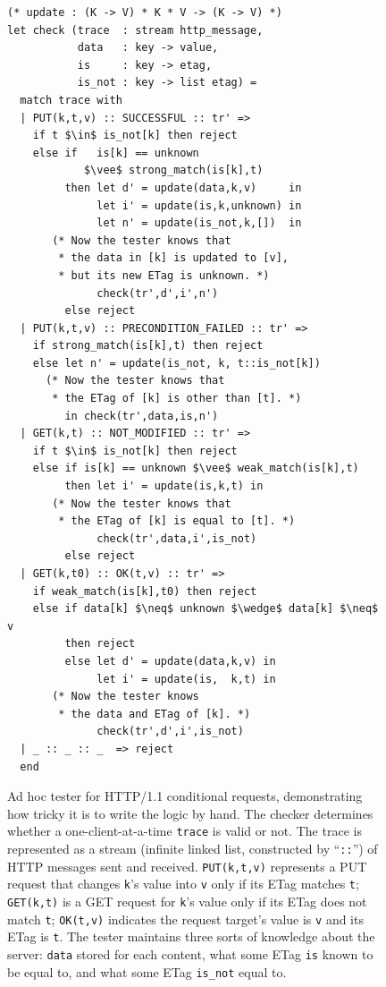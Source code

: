 \documentclass[12pt,oneside]{amsbook}
\newcommand{\http}{HTTP/1.1\xspace}
\newcommand{\ilc}[1]{\lstinline[style=customcoq]{#1}}
\numberwithin{section}{chapter}
\numberwithin{figure}{chapter}
\numberwithin{equation}{chapter}
\begin{document}
\begin{figure}
  \begin{lstlisting}[style=customcoq,mathescape=true]
(* update : (K -> V) * K * V -> (K -> V) *)
let check (trace  : stream http_message,
           data   : key -> value,
           is     : key -> etag,
           is_not : key -> list etag) =
  match trace with
  | PUT(k,t,v) :: SUCCESSFUL :: tr' =>
    if t $\in$ is_not[k] then reject
    else if   is[k] == unknown
            $\vee$ strong_match(is[k],t)
         then let d' = update(data,k,v)     in
              let i' = update(is,k,unknown) in
              let n' = update(is_not,k,[])  in
       (* Now the tester knows that
        * the data in [k] is updated to [v],
        * but its new ETag is unknown. *)
              check(tr',d',i',n')
         else reject
  | PUT(k,t,v) :: PRECONDITION_FAILED :: tr' =>
    if strong_match(is[k],t) then reject
    else let n' = update(is_not, k, t::is_not[k])
      (* Now the tester knows that
       * the ETag of [k] is other than [t]. *)
         in check(tr',data,is,n')
  | GET(k,t) :: NOT_MODIFIED :: tr' =>
    if t $\in$ is_not[k] then reject
    else if is[k] == unknown $\vee$ weak_match(is[k],t)
         then let i' = update(is,k,t) in
       (* Now the tester knows that
        * the ETag of [k] is equal to [t]. *)
              check(tr',data,i',is_not)
         else reject
  | GET(k,t0) :: OK(t,v) :: tr' =>
    if weak_match(is[k],t0) then reject
    else if data[k] $\neq$ unknown $\wedge$ data[k] $\neq$ v
         then reject
         else let d' = update(data,k,v) in
              let i' = update(is,  k,t) in
       (* Now the tester knows
        * the data and ETag of [k]. *)
              check(tr',d',i',is_not)
  | _ :: _ :: _  => reject
  end
  \end{lstlisting}
  \caption{Ad hoc tester for \http conditional requests, demonstrating how
    tricky it is to write the logic by hand.  The checker determines whether a
    one-client-at-a-time \ilc{trace} is valid or not.  The trace is represented
    as a stream (infinite linked list, constructed by ``\ilc{::}'') of HTTP
    messages sent and received.
    \ilc{PUT(k,t,v)} represents a PUT
    request that changes \ilc{k}'s value into \ilc{v} only if its ETag matches
    \ilc{t}; \ilc{GET(k,t)} is a GET request for \ilc{k}'s value only if its
    ETag does not match \ilc{t}; \ilc{OK(t,v)} indicates the request target's
    value is \ilc{v} and its ETag is \ilc{t}.  The tester maintains three
    sorts of  knowledge about
    the server: \ilc{data} stored for each content, what some
    ETag \ilc{is} known to be equal to, and what some ETag \ilc{is_not} equal
    to.
  }
  \label{fig:etag-tester}
\end{figure}
\end{document}
